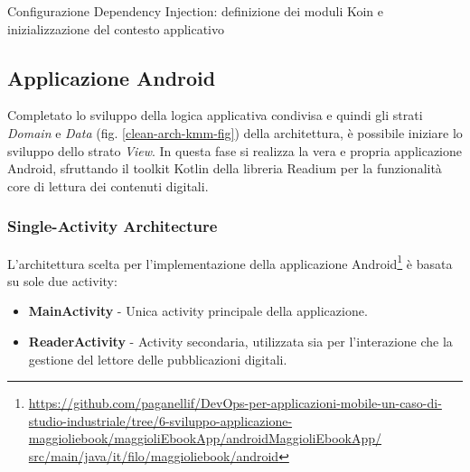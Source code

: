 \begin{listing}[H]
    \inputminted{kotlin}{code/shared-di-koin.kt}
    \caption{Configurazione Dependency Injection: definizione dei moduli Koin e inizializzazione del contesto applicativo}
\end{listing}

\subsection{Applicazione Android}
Completato lo sviluppo della logica applicativa condivisa e quindi gli strati \textit{Domain} e \textit{Data} (fig. \ref{clean-arch-kmm-fig}) della architettura, è possibile iniziare lo sviluppo dello strato \textit{View}. In questa fase si realizza la vera e propria applicazione Android, sfruttando il toolkit Kotlin della libreria Readium per la funzionalità core di lettura dei contenuti digitali.

\subsubsection*{Single-Activity Architecture}
L'architettura scelta per l'implementazione della applicazione Android\footnote{\href{https://github.com/paganellif/DevOps-per-applicazioni-mobile-un-caso-di-studio-industriale/tree/6-sviluppo-applicazione-maggioliebook/maggioliEbookApp/androidMaggioliEbookApp/src/main/java/it/filo/maggioliebook/android}{https://github.com/paganellif/DevOps-per-applicazioni-mobile-un-caso-di-studio-industriale/tree/6-sviluppo-applicazione-maggioliebook/maggioliEbookApp/androidMaggioliEbookApp/\\src/main/java/it/filo/maggioliebook/android}} è basata su sole due activity:

\begin{itemize}
    \item \textbf{MainActivity} - Unica activity principale della applicazione.
    \item \textbf{ReaderActivity} - Activity secondaria, utilizzata sia per l'interazione che la gestione del lettore delle pubblicazioni digitali.
\end{itemize}

